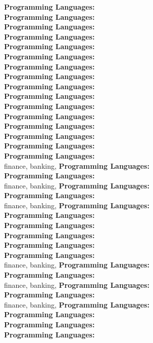 \textbf{Programming Languages:} \\
\textbf{Programming Languages:} \\
\textbf{Programming Languages:} \\
\textbf{Programming Languages:} \\
\textbf{Programming Languages:} \\
\textbf{Programming Languages:} \\
\textbf{Programming Languages:} \\
\textbf{Programming Languages:} \\
\textbf{Programming Languages:} \\
\textbf{Programming Languages:} \\
\textbf{Programming Languages:} \\
\textbf{Programming Languages:} \\
\textbf{Programming Languages:} \\
\textbf{Programming Languages:} \\
\textbf{Programming Languages:} \\
\textbf{Programming Languages:} \\
finance, banking, \textbf{Programming Languages:} \\
\textbf{Programming Languages:} \\
finance, banking, \textbf{Programming Languages:} \\
\textbf{Programming Languages:} \\
finance, banking, \textbf{Programming Languages:} \\
\textbf{Programming Languages:} \\
\textbf{Programming Languages:} \\
\textbf{Programming Languages:} \\
\textbf{Programming Languages:} \\
\textbf{Programming Languages:} \\
finance, banking, \textbf{Programming Languages:} \\
\textbf{Programming Languages:} \\
finance, banking, \textbf{Programming Languages:} \\
\textbf{Programming Languages:} \\
finance, banking, \textbf{Programming Languages:} \\
\textbf{Programming Languages:} \\
\textbf{Programming Languages:} \\
\textbf{Programming Languages:} \\
